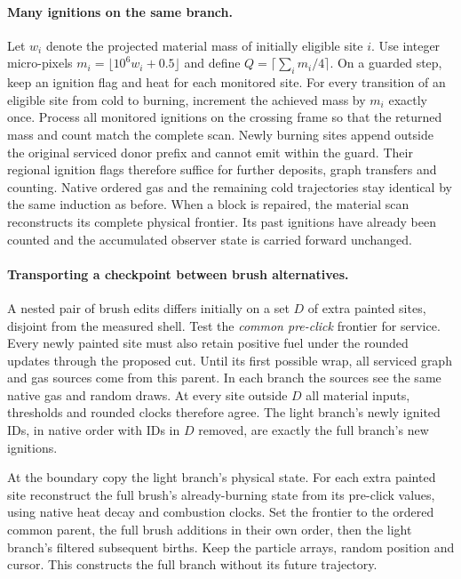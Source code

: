 \documentclass[acmtog,anonymous,review]{acmart}
\begin{document}
\paragraph{Many ignitions on the same branch.}
Let $w_i$ denote the projected material mass of initially eligible site $i$. Use integer micro-pixels $m_i=\lfloor 10^6 w_i+0.5\rfloor$ and define $Q=\lceil\sum_i m_i/4\rceil$. On a guarded step, keep an ignition flag and heat for each monitored site. For every transition of an eligible site from cold to burning, increment the achieved mass by $m_i$ exactly once. Process all monitored ignitions on the crossing frame so that the returned mass and count match the complete scan. Newly burning sites append outside the original serviced donor prefix and cannot emit within the guard. Their regional ignition flags therefore suffice for further deposits, graph transfers and counting. Native ordered gas and the remaining cold trajectories stay identical by the same induction as before. When a block is repaired, the material scan reconstructs its complete physical frontier. Its past ignitions have already been counted and the accumulated observer state is carried forward unchanged.

\paragraph{Transporting a checkpoint between brush alternatives.}
A nested pair of brush edits differs initially on a set $D$ of extra painted sites, disjoint from the measured shell. Test the \emph{common pre-click} frontier for service. Every newly painted site must also retain positive fuel under the rounded updates through the proposed cut. Until its first possible wrap, all serviced graph and gas sources come from this parent. In each branch the sources see the same native gas and random draws. At every site outside $D$ all material inputs, thresholds and rounded clocks therefore agree. The light branch's newly ignited IDs, in native order with IDs in $D$ removed, are exactly the full branch's new ignitions.

At the boundary copy the light branch's physical state. For each extra painted site reconstruct the full brush's already-burning state from its pre-click values, using native heat decay and combustion clocks. Set the frontier to the ordered common parent, the full brush additions in their own order, then the light branch's filtered subsequent births. Keep the particle arrays, random position and cursor. This constructs the full branch without its future trajectory.
\end{document}
